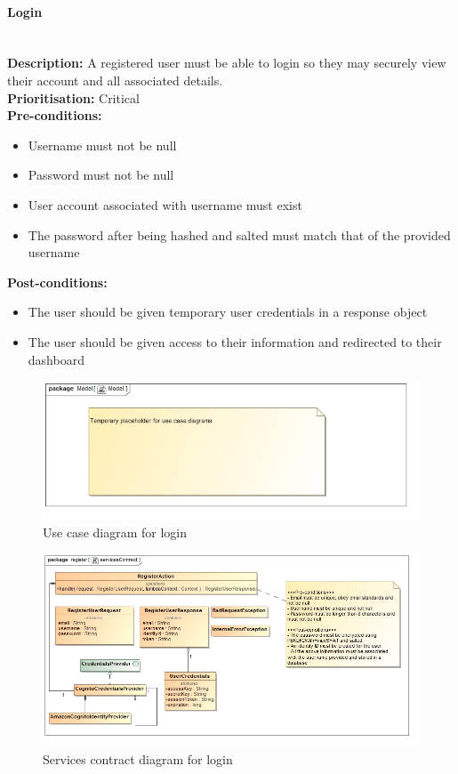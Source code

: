 \documentclass{article}
\begin{document}
	\paragraph{Login}\mbox{}\\
		\textbf{Description:} A registered user must be able to login so they may securely view their account and all associated details.\\
		\textbf{Prioritisation:} Critical\\		
		\textbf{Pre-conditions:}
			\begin{itemize}
				\item Username must not be null
				\item Password must not be null
				\item User account associated with username must exist
				\item The password after being hashed and salted must match that of the provided username
			\end{itemize}
		\textbf{Post-conditions:}
			\begin{itemize}
				\item The user should be given temporary user credentials in a response object
				\item The user should be given access to their information and redirected to their dashboard
			\end{itemize}

		\begin{figure}[H]
			\includegraphics[width=\linewidth]{images/tempUseCase.jpg}
			\caption{Use case diagram for login}
		\end{figure}		
		
		\begin{figure}[H]
			\includegraphics[width=\linewidth]{images/ServicesContracts/login.jpg}
			\caption{Services contract diagram for login}
		\end{figure}
		
\end{document}
